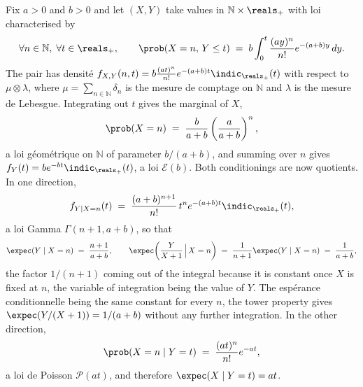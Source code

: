 \begin{example}
  Fix $a > 0$ and $b > 0$ and let $(X,Y)$ take values in
  $\mathbb{N} \times \reals_{+}$ with loi characterised by
  \[
    \forall n \in \mathbb{N}, \; \forall t \in \reals_{+}, \qquad
    \prob(X = n, \, Y \leq t) \;=\; b \int_{0}^{t} \frac{(ay)^{n}}{n!} e^{-(a+b)y} \, dy .
  \]
  The pair has densité
  $f_{X,Y}(n,t) = b \frac{(at)^{n}}{n!} e^{-(a+b)t} \indic_{\reals_{+}}(t)$
  with respect to $\mu \otimes \lambda$, where
  $\mu = \sum_{n \in \mathbb{N}} \delta_{n}$ is the mesure de comptage on
  $\mathbb{N}$ and $\lambda$ is the mesure de Lebesgue. Integrating out $t$ gives
  the marginal of $X$,
  \[
    \prob(X = n) \;=\; \frac{b}{a+b} \left( \frac{a}{a+b} \right)^{n} ,
  \]
  a loi géométrique on $\mathbb{N}$ of parameter $b/(a+b)$, and summing over $n$
  gives $f_{Y}(t) = b e^{-bt} \indic_{\reals_{+}}(t)$, a loi $\mathcal{E}(b)$.
  Both conditionings are now quotients. In one direction,
  \[
    f_{Y \mid X = n}(t) \;=\; \frac{(a+b)^{n+1}}{n!} \, t^{n} e^{-(a+b)t} \indic_{\reals_{+}}(t) ,
  \]
  a loi Gamma $\Gamma(n+1, a+b)$, so that
  \[
    \expec(Y \mid X = n) \;=\; \frac{n+1}{a+b} ,
    \qquad
    \expec\!\left( \frac{Y}{X+1} \,\Big|\, X = n \right) \;=\; \frac{1}{n+1} \expec(Y \mid X = n) \;=\; \frac{1}{a+b} ,
  \]
  the factor $1/(n+1)$ coming out of the integral because it is constant once $X$
  is fixed at $n$, the variable of integration being the value of $Y$. The
  espérance conditionnelle being the same constant for every $n$, the tower
  property gives $\expec(Y/(X+1)) = 1/(a+b)$ without any further
  integration. In the other direction,
  \[
    \prob(X = n \mid Y = t) \;=\; \frac{(at)^{n}}{n!} e^{-at} ,
  \]
  a loi de Poisson $\mathcal{P}(at)$, and therefore $\expec(X \mid Y = t) = at$.
\end{example}

